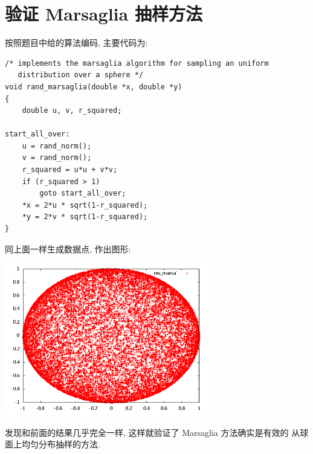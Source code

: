 \documentclass{ctexart}
\begin{document}
\section{验证 Marsaglia 抽样方法}
按照题目中给的算法编码, 主要代码为:
\begin{verbatim}
/* implements the marsaglia algorithm for sampling an uniform
   distribution over a sphere */
void rand_marsaglia(double *x, double *y)
{
    double u, v, r_squared;

start_all_over:
    u = rand_norm();
    v = rand_norm();
    r_squared = u*u + v*v;
    if (r_squared > 1)
        goto start_all_over;
    *x = 2*u * sqrt(1-r_squared);
    *y = 2*v * sqrt(1-r_squared);
}
\end{verbatim}
同上面一样生成数据点, 作出图形:
\begin{center}
\includegraphics[width=3.5in]{sph_marsa.png}
\end{center}
发现和前面的结果几乎完全一样, 这样就验证了 Marsaglia 方法确实是有效的
从球面上均匀分布抽样的方法.
\end{document}
